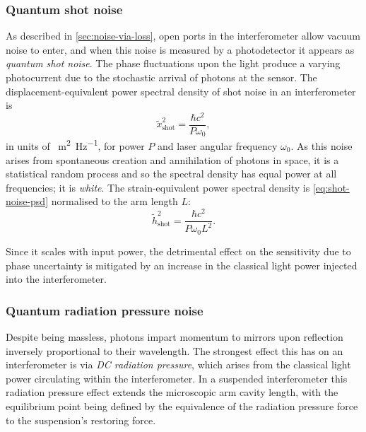 \subsubsection{\label{sec:quantum-shot-noise}Quantum shot noise}
As described in \cref{sec:noise-via-loss}, open ports in the interferometer allow vacuum noise to enter, and when this noise is measured by a photodetector it appears as \emph{quantum shot noise}. The phase fluctuations upon the light produce a varying photocurrent due to the stochastic arrival of photons at the sensor. The displacement-equivalent power spectral density of shot noise in an interferometer is
\begin{equation}
  \label{eq:shot-noise-psd}
  \tilde{x}^2_{\text{shot}} = \frac{\hbar c^2}{P \omega_0},
\end{equation}
in units of \SI{}{\meter^2\per\hertz}, for power $P$ and laser angular frequency $\omega_0$. As this noise arises from  spontaneous creation and annihilation of photons in space, it is a statistical random process and so the spectral density has equal power at all frequencies; it is \emph{white}. The strain-equivalent power spectral density is \cref{eq:shot-noise-psd} normalised to the arm length $L$:
\begin{equation}
  \tilde{h}^2_{\text{shot}} = \frac{\hbar c^2}{P \omega_0 L^2}.
\end{equation}

Since it scales with input power, the detrimental effect on the sensitivity due to phase uncertainty is mitigated by an increase in the classical light power injected into the interferometer.

\subsubsection{\label{sec:quantum-rp-noise}Quantum radiation pressure noise}
Despite being massless, photons impart momentum to mirrors upon reflection inversely proportional to their wavelength. The strongest effect this has on an interferometer is via \emph{\gls{DC} radiation pressure}, which arises from the classical light power circulating within the interferometer. In a suspended interferometer this radiation pressure effect extends the microscopic arm cavity length, with the equilibrium point being defined by the equivalence of the radiation pressure force to the suspension's restoring force.

